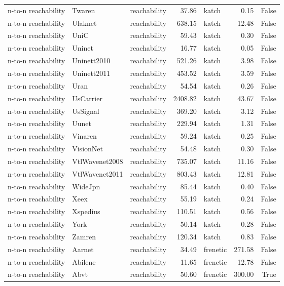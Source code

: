 \begin{tabular}{lllrlrr}
n-to-n reachability & Twaren & reachability & 37.86 & katch & 0.15 & False \\
n-to-n reachability & Ulaknet & reachability & 638.15 & katch & 12.48 & False \\
n-to-n reachability & UniC & reachability & 59.43 & katch & 0.30 & False \\
n-to-n reachability & Uninet & reachability & 16.77 & katch & 0.05 & False \\
n-to-n reachability & Uninett2010 & reachability & 521.26 & katch & 3.98 & False \\
n-to-n reachability & Uninett2011 & reachability & 453.52 & katch & 3.59 & False \\
n-to-n reachability & Uran & reachability & 54.54 & katch & 0.26 & False \\
n-to-n reachability & UsCarrier & reachability & 2408.82 & katch & 43.67 & False \\
n-to-n reachability & UsSignal & reachability & 369.20 & katch & 3.12 & False \\
n-to-n reachability & Uunet & reachability & 229.94 & katch & 1.31 & False \\
n-to-n reachability & Vinaren & reachability & 59.24 & katch & 0.25 & False \\
n-to-n reachability & VisionNet & reachability & 54.48 & katch & 0.30 & False \\
n-to-n reachability & VtlWavenet2008 & reachability & 735.07 & katch & 11.16 & False \\
n-to-n reachability & VtlWavenet2011 & reachability & 803.43 & katch & 12.81 & False \\
n-to-n reachability & WideJpn & reachability & 85.44 & katch & 0.40 & False \\
n-to-n reachability & Xeex & reachability & 55.19 & katch & 0.24 & False \\
n-to-n reachability & Xspedius & reachability & 110.51 & katch & 0.56 & False \\
n-to-n reachability & York & reachability & 50.14 & katch & 0.28 & False \\
n-to-n reachability & Zamren & reachability & 120.34 & katch & 0.83 & False \\
n-to-n reachability & Aarnet & reachability & 34.49 & frenetic & 271.58 & False \\
n-to-n reachability & Abilene & reachability & 11.65 & frenetic & 12.78 & False \\
n-to-n reachability & Abvt & reachability & 50.60 & frenetic & 300.00 & True \\

\end{tabular}
